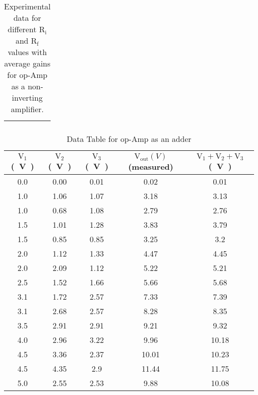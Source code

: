 \documentclass{scrartcl}
\begin{document}
\begin{table}[H]
\begin{tabular}{|c|c|c|c|c|c|c|c|c|}
    &
     \\
    \hline
    \end{tabular}
    \caption{Experimental data for different $\mathrm{R_i}$ and $\mathrm{R_f}$ values with average gains for op-Amp as a non-inverting amplifier.}
    \label{tab:multi_column_table}
\end{table}



\begin{table}[H]
    \centering
    \begin{tabular}{|c|c|c|c|c|}
    \hline
    $\mathrm{V_1}$ \si{(V)} & $\mathrm{V_2}$ \si{(V)} & $\mathrm{V_3}$ \si{(V)} & \thead{$\mathrm{V_{\text{out}}}\si{(V)}$\\ (measured)} & \thead{$\mathrm{V_1} +\mathrm{V_2}+\mathrm{V_3} $ \\ \si{(V)}} \\ \hline
    0.0    & 0.00    & 0.01 & 0.02 & 0.01 \\ \hline
    1.0    & 1.06 & 1.07 & 3.18 & 3.13 \\ \hline
    1.0    & 0.68 & 1.08 & 2.79 & 2.76 \\ \hline
    1.5  & 1.01 & 1.28 & 3.83 & 3.79 \\ \hline
    1.5  & 0.85 & 0.85 & 3.25 & 3.2  \\ \hline
    2.0    & 1.12 & 1.33 & 4.47 & 4.45 \\ \hline
    2.0    & 2.09 & 1.12 & 5.22 & 5.21 \\ \hline
    2.5  & 1.52 & 1.66 & 5.66 & 5.68 \\ \hline
    3.1  & 1.72 & 2.57 & 7.33 & 7.39 \\ \hline
    3.1  & 2.68 & 2.57 & 8.28 & 8.35 \\ \hline
    3.5  & 2.91 & 2.91 & 9.21 & 9.32 \\ \hline
    4.0    & 2.96 & 3.22 & 9.96 & 10.18 \\ \hline
    4.5  & 3.36 & 2.37 & 10.01 & 10.23 \\ \hline
    4.5  & 4.35 & 2.9  & 11.44 & 11.75 \\ \hline
    5.0    & 2.55 & 2.53 & 9.88 & 10.08 \\ \hline
    \end{tabular}
    \caption{Data Table for op-Amp as an adder}
    \label{tab:voltage_measurements}
    \end{table}
\end{document}
